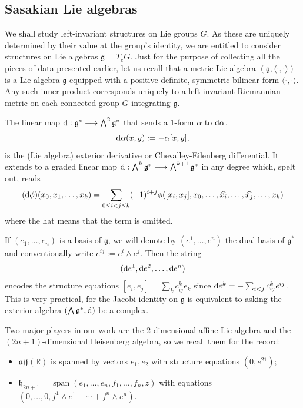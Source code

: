 \documentclass[12pt, twoside]{amsart}
\def\D{\textup{d}}
\def\g{\mathfrak{g}}
\def\h{\mathfrak{h}}
\def\R{\mathbb{R}}
\def\aff{\mathfrak{aff}}
\def\pint{\langle \cdotp,\cdotp \rangle }
\theoremstyle{definition}
\begin{document}
\subsection{Sasakian Lie algebras}

We shall study left-invariant structures on Lie groups $G$. 
As these are uniquely determined by their value at the group's identity,  we are entitled to consider structures on Lie algebras $\g=T_eG$. Just for the purpose of collecting all the pieces of data presented earlier, let us recall that a metric Lie algebra $(\g,\pint)$ is a Lie algebra $\g$ equipped with a positive-definite, symmetric bilinear form $\pint$.
Any such inner product corresponds uniquely to a left-invariant Riemannian metric on each connected group $G$ integrating $\g$.\par
\quad  The linear map $\D:\g^* \longrightarrow \bigwedge^2 \g^*$ that sends a $1$-form 
 $\alpha$ to $\D \alpha$, 
 $$\D \alpha(x,y) := -\alpha [x,y],$$          
is the (Lie algebra) exterior derivative or Chevalley-Eilenberg differential. It extends to a graded linear map $\D:\bigwedge^k \g^* \longrightarrow \bigwedge^{k+1} \g^*$ in any degree 
which, spelt out, reads 
\[(\D\phi)(x_0, x_1, \ldots,  x_k)=\sum_{0\leq i < j \leq k}(-1)^{i+j}\phi([x_i, x_j],x_0,\ldots, \widehat{x_i}, \dots , \widehat{x_j}, \dots ,x_{k})\]
where the hat means that the term is omitted. \par
\quad If $(e_1,\ldots, e_n)$ is a basis of $\g$, we will denote by $(e^1,\ldots, e^n)$ the dual basis of $\g^*$ and conventionally write $e^{ij}:=e^{i} \wedge e^{j}$. 
Then the string 
\[(\D e^1,\D e^2,\ldots, \D e^n)\]
encodes the structure equations $[e_i, e_j]=\sum_{k}c_{ij}^ke_k$ since $\D e^k=-\sum_{i<j} c_{ij}^k e^{ij}$. This is very practical, for the Jacobi identity on $\g$ is equivalent to asking the exterior algebra $(\bigwedge \g^*, \D)$ be a complex.\smallskip

Two major players in our work are the $2$-dimensional affine Lie algebra 
and the $(2n+1)$-dimensional Heisenberg algebra, so we recall them for the record:
\begin{itemize}
\item[]\hspace{-1cm} $\aff(\R)$ is spanned by vectors $e_1,e_2$ with structure equations $(0, e^{21})$;\smallbreak 
\item[]\hspace{-1cm} $\h_{2n+1}=\operatorname{span}(e_1, \ldots, e_n, f_1, \ldots, f_n, z)$ with 
equations $(0,\ldots, 0, f^1\wedge e^1+\cdots + f^n\wedge e^n)$.
\end{itemize}
\end{document}
